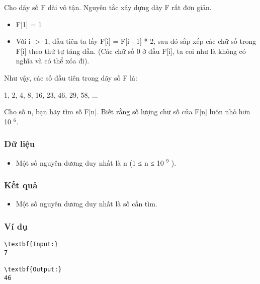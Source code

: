 



   Cho dãy số F dài vô tận. Nguyên tắc xây dựng dãy F rất đơn giản.  
\begin{itemize}
	\item     F[1] = 1   
	\item     Với i $>$ 1, đầu tiên ta lấy F[i] = F[i - 1] * 2, sau đó sắp xếp các chữ số trong F[i] theo thứ tự tăng dần. (Các chữ số 0 ở đầu F[i], ta coi như là không có nghĩa và có thể xóa đi).   
\end{itemize}

   Như vậy, các số đầu tiên trong dãy số F là:  

   1, 2, 4, 8, 16, 23, 46, 29, 58, ...  

   Cho số n, bạn hãy tìm số F[n]. Biết rằng số lượng chữ số của F[n] luôn nhỏ hơn 10   $^    6.   $

\subsubsection{   Dữ liệu  }
\begin{itemize}
	\item     Một số nguyên dương duy nhất là n (1 ≤ n ≤ 10    $^     9    $    ).   
\end{itemize}

\subsubsection{   Kết quả  }
\begin{itemize}
	\item     Một số nguyên dương duy nhất là số cần tìm.   
\end{itemize}

\subsubsection{   Ví dụ  }
\begin{verbatim}
\textbf{Input:}
7

\textbf{Output:}
46\end{verbatim}